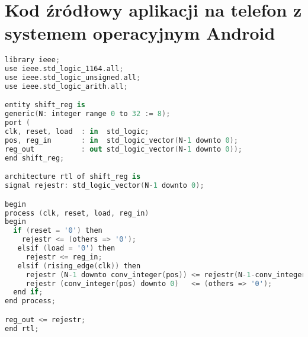 \chapter{Kod źródłowy aplikacji na telefon z systemem operacyjnym Android}

\begin{lstlisting}[language=kotlin, xleftmargin=0pt, backgroundcolor={\color{white}}, caption={}, frame=""]
library ieee;
use ieee.std_logic_1164.all;
use ieee.std_logic_unsigned.all;
use ieee.std_logic_arith.all;

entity shift_reg is
generic(N: integer range 0 to 32 := 8);
port (
clk, reset, load  : in  std_logic;
pos, reg_in       : in  std_logic_vector(N-1 downto 0);
reg_out           : out std_logic_vector(N-1 downto 0));
end shift_reg;

architecture rtl of shift_reg is
signal rejestr: std_logic_vector(N-1 downto 0);

begin
process (clk, reset, load, reg_in)
begin
  if (reset = '0') then 
    rejestr <= (others => '0');
   elsif (load = '0') then
     rejestr <= reg_in;
   elsif (rising_edge(clk)) then
     rejestr (N-1 downto conv_integer(pos)) <= rejestr(N-1-conv_integer(pos) downto 0);
     rejestr (conv_integer(pos) downto 0)   <= (others => '0');
  end if;
end process;

reg_out <= rejestr;
end rtl;
\end{lstlisting}
